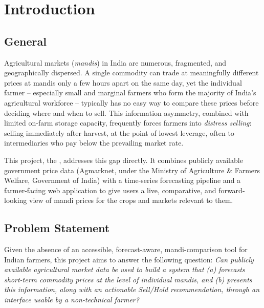 \chapter{Introduction}

\section{General}
Agricultural markets (\textit{mandis}) in India are numerous, fragmented,
and geographically dispersed. A single commodity can trade at meaningfully
different prices at mandis only a few hours apart on the same day, yet the
individual farmer -- especially small and marginal farmers who form the
majority of India's agricultural workforce -- typically has no easy way to
compare these prices before deciding where and when to sell. This
information asymmetry, combined with limited on-farm storage capacity,
frequently forces farmers into \textit{distress selling}: selling
immediately after harvest, at the point of lowest leverage, often to
intermediaries who pay below the prevailing market rate.

This project, the \textbf{\ProjectTitle}, addresses this gap directly. It
combines publicly available government price data (Agmarknet, under the
Ministry of Agriculture \& Farmers Welfare, Government of India) with a
time-series forecasting pipeline and a farmer-facing web application to
give users a live, comparative, and forward-looking view of mandi prices
for the crops and markets relevant to them.

\section{Problem Statement}
Given the absence of an accessible, forecast-aware, mandi-comparison tool
for Indian farmers, this project aims to answer the following question:
\textit{Can publicly available agricultural market data be used to build a
system that (a) forecasts short-term commodity prices at the level of
individual mandis, and (b) presents this information, along with an
actionable Sell/Hold recommendation, through an interface usable by a
non-technical farmer?}

